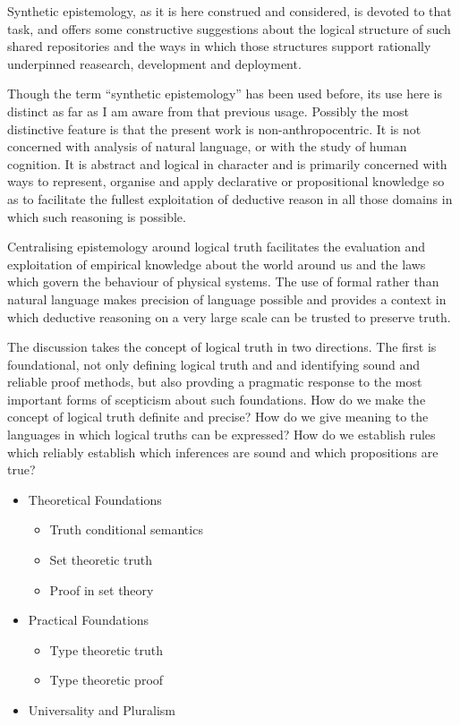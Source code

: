 \documentclass[10pt,titlepage]{book}
\begin{document}
Synthetic epistemology, as it is here construed and considered, is devoted to that task, and offers some constructive suggestions about the logical structure of such shared repositories and the ways in which those structures support rationally underpinned reasearch, development and deployment.

Though the term ``synthetic epistemology'' has been used before, its use here is distinct as far as I am aware from that previous usage.
Possibly the most distinctive feature is that the present work is non-anthropocentric.
It is not concerned with analysis of natural language, or with the study of human cognition.
It is abstract and logical in character and is primarily concerned with ways to represent, organise and apply declarative or propositional knowledge so as to facilitate the fullest exploitation of deductive reason in all those domains in which such reasoning is possible.

Centralising epistemology around logical truth facilitates the evaluation and exploitation of empirical knowledge about the world around us and the laws which govern the behaviour of physical systems.
The use of formal rather than natural language makes precision of language possible and provides a context in which deductive reasoning on a very large scale can be trusted to preserve truth.

The discussion takes the concept of logical truth in two directions.
The first is foundational, not only defining logical truth and and identifying sound and reliable proof methods, but also provding a pragmatic response to the most important forms of scepticism about such foundations.
How do we make the concept of logical truth definite and precise?
How do we give meaning to the languages in which logical truths can be expressed?
How do we establish rules which reliably establish which inferences are sound and which propositions are true?

\begin{itemize}
\item Theoretical Foundations
  \begin{itemize}
    \item Truth conditional semantics
  \item Set theoretic truth
  \item Proof in set theory
  \end{itemize}
\item Practical Foundations
  \begin{itemize}
  \item Type theoretic truth
  \item Type theoretic proof
  \end{itemize}
\item Universality and Pluralism
  \end{itemize}
\end{document}

